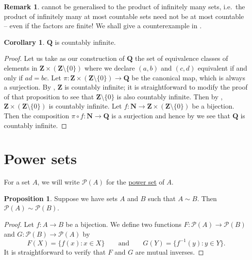 \documentclass[12pt]{article}
\theoremstyle{definition}
\newtheorem{proposition}[definition]{Proposition}
\newtheorem{corollary}[definition]{Corollary}
\newtheorem*{remark}{Remark}
\newcommand{\N}{\mathbf{N}}
\newcommand{\Z}{\mathbf{Z}}
\newcommand{\Q}{\mathbf{Q}}
\begin{document}
\begin{remark}
     cannot be generalised to the product of infinitely many sets, i.e.\ the product of infinitely many at most countable sets need not be at most countable -- even if the factors are finite! We shall give a counterexample in .
\end{remark}

\begin{corollary}
\label{cor:Q_is_countable}
    \( \Q \) is countably infinite.
\end{corollary}

\begin{proof}
    Let us take as our construction of \( \Q \) the set of equivalence classes of elements in \( \Z \times (\Z \setminus \{ 0 \}) \) where we declare \( (a, b) \) and \( (c, d) \) equivalent if and only if \( ad = bc \). Let \( \pi : \Z \times (\Z \setminus \{ 0 \}) \to \Q \) be the canonical map, which is always a surjection. By , \( \Z \) is countably infinite; it is straightforward to modify the proof of that proposition to see that \( \Z \setminus \{ 0 \} \) is also countably infinite. Then by , \( \Z \times (\Z \setminus \{ 0 \}) \) is countably infinite. Let \( f : \N \to \Z \times (\Z \setminus \{ 0 \}) \) be a bijection. Then the composition \( \pi \circ f : \N \to \Q \) is a surjection and hence by  we see that \( \Q \) is countably infinite.
\end{proof}

\section{Power sets}
\label{sec:power_sets}

For a set \( A \), we will write \( \mathscr{P}(A) \) for the \href{https://en.wikipedia.org/wiki/Power_set}{power set} of \( A \).

\begin{proposition}
\label{prop:bijection_between_sets_implies_bijection_between_power_sets}
    Suppose we have sets \( A \) and \( B \) such that \( A \sim B \). Then \( \mathscr{P}(A) \sim \mathscr{P}(B) \).
\end{proposition}

\begin{proof}
    Let \( f : A \to B \) be a bijection. We define two functions \( F : \mathscr{P}(A) \to \mathscr{P}(B) \) and \( G : \mathscr{P}(B) \to \mathscr{P}(A) \) by
    \[
        F(X) = \{ f(x) : x \in X \} \qquad \text{and} \qquad G(Y) = \{ f^{-1}(y) : y \in Y \}.
    \]
    It is straightforward to verify that \( F \) and \( G \) are mutual inverses.
\end{proof}
\end{document}
